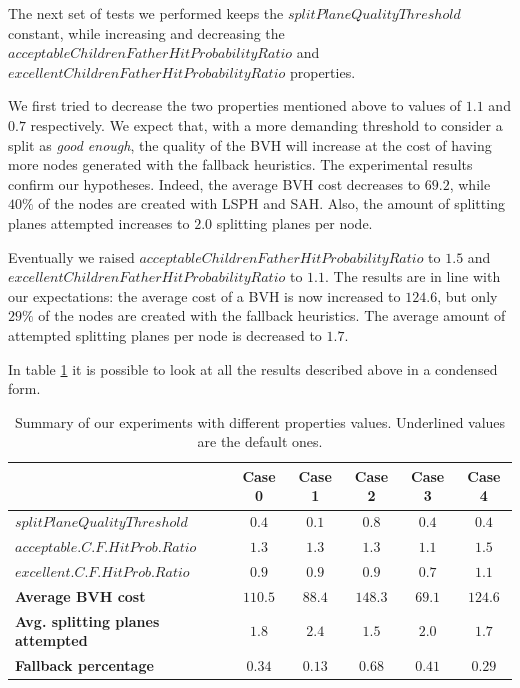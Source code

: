 \documentclass{PoliMi_MasterThesis}
\begin{document}
The next set of tests we performed keeps the $splitPlaneQualityThreshold$ constant, while increasing and decreasing the $acceptableChildrenFatherHitProbabilityRatio$ and $excellentChildrenFatherHitProbabilityRatio$ properties.

We first tried to decrease the two properties mentioned above to values of $1.1$ and $0.7$ respectively. We expect that, with a more demanding threshold to consider a split as \textit{good enough}, the quality of the BVH will increase at the cost of having more nodes generated with the fallback heuristics. The experimental results confirm our hypotheses. Indeed, the average BVH cost decreases to $69.2$, while $40\%$ of the nodes are created with LSPH and SAH. Also, the amount of splitting planes attempted increases to $2.0$ splitting planes per node.

Eventually we raised $acceptableChildrenFatherHitProbabilityRatio$ to $1.5$ and \\$excellentChildrenFatherHitProbabilityRatio$ to $1.1$. The results are in line with our expectations: the average cost of a BVH is now increased to $124.6$, but only $29\%$ of the nodes are created with the fallback heuristics. The average amount of attempted splitting planes per node is decreased to $1.7$.

In table \ref{tab:different_properties_summary} it is possible to look at all the results described above in a condensed form.

\begin{table}[H]
    \centering
    \begin{tabular}{|l|c|c|c|c|c|}
		\hline
		& \textbf{Case 0} & \textbf{Case 1} & \textbf{Case 2} & \textbf{Case 3} & \textbf{Case 4}\\ 
		\hline \hline
        \boldmath$splitPlaneQualityThreshold$ & \underline{$0.4$} & $0.1$ & $0.8$ & \underline{$0.4$} & \underline{$0.4$}\\
		\boldmath$acceptable.C.F.HitProb.Ratio$ & \underline{$1.3$} & \underline{$1.3$} & \underline{$1.3$} & $1.1$ & $1.5$\\
		\boldmath$excellent.C.F.HitProb.Ratio$ & \underline{$0.9$} & \underline{$0.9$} & \underline{$0.9$} & $0.7$ & $1.1$\\
		\hline
		\textbf{Average BVH cost} & $110.5$ & $88.4$ & $148.3$ & $69.1$ & $124.6$\\
		\textbf{Avg. splitting planes attempted} & $1.8$ & $2.4$ & $1.5$ & $2.0$ & $1.7$\\
		\textbf{Fallback percentage} & $0.34$ & $0.13$ & $0.68$ & $0.41$ & $0.29$\\
		\hline
    \end{tabular}
	\caption{Summary of our experiments with different properties values. Underlined values are the default ones.}
	\label{tab:different_properties_summary}
\end{table}
\end{document}
